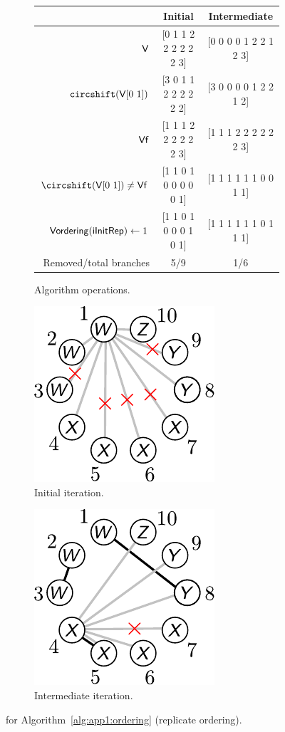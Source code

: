 \begin{figure}[!ht]

\begin{subfigure}[b]{\textwidth}
\centering
\begin{tabular}{r | c | c}
\hline \hline
 & Initial & Intermediate \\ 
\hline
$\textup{\textsf{V}}$ & [0 1 1 2 2 2 2 2 2 3] & [0 0 0 0 1 2 2 1 2 3] \\
$\texttt{circshift}(\textup{\textsf{V}} [0\ 1])$  & [3 0 1 1 2 2 2 2 2 2] & [3 0 0 0 0 1 2 2 1 2] \\
$\textup{\textsf{Vf}}$  & [1 1 1 2 2 2 2 2 2 3] & [1 1 1 2 2 2 2 2 2 3] \\
$\circshift(\xvar{V}[0\ 1]) \neq \xvar{Vf}$  & [1 1 0 1 0 0 0 0 0 1] & [1 1 1 1 1 1 0 0 1 1] \\
$\textup{\textsf{Vordering}}(\textup{\textsf{iInitRep}}) \leftarrow 1$ &  [1 1 0 1 0 0 0 1 0 1] & [1 1 1 1 1 1 0 1 1 1]  \\
Removed/total branches & 5/9 & 1/6 \\
\hline \hline
\end{tabular}
\caption{Algorithm operations.\label{tb:app1:ordering-ex2-V}}
\end{subfigure}%

\begin{subfigure}[b]{0.5\textwidth}
\centering
\includegraphics[scale=1]{../app1/fig/ordering-ex2-original_v2}
\caption{Initial iteration.\label{fig:app1:ordering-ex2-original}}
\end{subfigure}%
\begin{subfigure}[b]{0.5\textwidth}
\centering
 \includegraphics[scale=1]{../app1/fig/ordering-ex2-intermediate_v2}
 \caption{Intermediate iteration.\label{fig:app1:ordering-ex2-intermediate}}
\end{subfigure}%

\caption{ for Algorithm~\ref{alg:app1:ordering} (replicate ordering).}
\end{figure}

